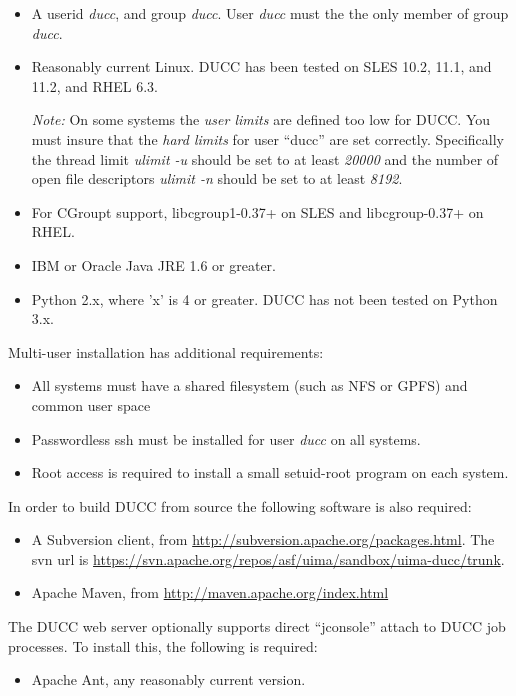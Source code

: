 \begin{itemize}
  \item A userid {\em ducc}, and group {\em ducc}.  User {\em ducc} must the the only member of group {\em ducc}.
  \item Reasonably current Linux.  DUCC has been tested on SLES 10.2, 11.1, and 11.2, and RHEL 6.3.
    
    {\em Note:} On some systems the {\em user limits} are defined too low for DUCC.  You must insure that
      the {\em hard limits} for user ``ducc'' are set correctly.  Specifically the thread limit {\em ulimit -u}
      should be set to at least {\em 20000} and the number of open file descriptors {\em ulimit -n} should be set
      to at least {\em 8192}.

  \item For CGroupt support, libcgroup1-0.37+ on SLES and libcgroup-0.37+ on RHEL.  
  \item IBM or Oracle Java JRE 1.6 or greater.
  \item Python 2.x, where 'x' is 4 or greater.  DUCC has not been tested on Python 3.x.
\end{itemize}
  
Multi-user installation has additional requirements:

\begin{itemize}
  \item All systems must have a shared filesystem (such as NFS or GPFS)  and common user space 
  \item Passwordless ssh must be installed for user {\em ducc} on all systems.
  \item Root access is required to install a small setuid-root program on each system.
\end{itemize}
  
In order to build DUCC from source the following software is also required:
\begin{itemize}
    \item A Subversion client, from \url{http://subversion.apache.org/packages.html}.  The
      svn url is \url{https://svn.apache.org/repos/asf/uima/sandbox/uima-ducc/trunk}.
    \item Apache Maven, from \url{http://maven.apache.org/index.html}
\end{itemize}

The DUCC web server optionally supports direct ``jconsole'' attach to DUCC job processes.  To install
this, the following is required:
\begin{itemize}
    \item Apache Ant, any reasonably current version.
\end{itemize}
    
